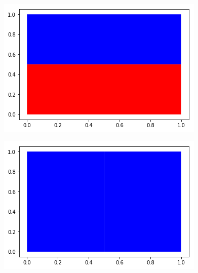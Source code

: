 \documentclass[12pt, a4paper]{article}
\begin{document}
\begin{figure}[H]
	\begin{minipage}[b]{.5\linewidth}
		\includegraphics[width = \textwidth]{seccion_horizontal}
		\label{fig:horizontal}

		\includegraphics[width = \textwidth]{seccion_vertical}
		\label{fig:vertical}


\end{minipage}
\end{figure}
\end{document}
